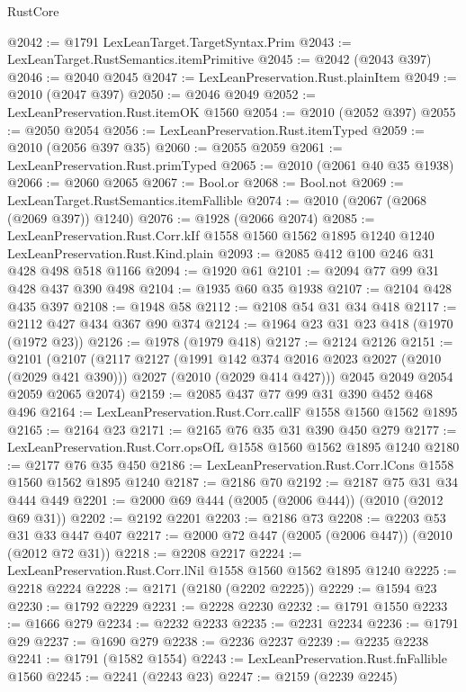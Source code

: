 \begin{lexlean}{RustCore}
\begin{coremodule}
@2042 := @1791 LexLeanTarget.TargetSyntax.Prim
@2043 := LexLeanTarget.RustSemantics.itemPrimitive
@2045 := @2042 (@2043 @397)
@2046 := @2040 @2045
@2047 := LexLeanPreservation.Rust.plainItem
@2049 := @2010 (@2047 @397)
@2050 := @2046 @2049
@2052 := LexLeanPreservation.Rust.itemOK @1560
@2054 := @2010 (@2052 @397)
@2055 := @2050 @2054
@2056 := LexLeanPreservation.Rust.itemTyped
@2059 := @2010 (@2056 @397 @35)
@2060 := @2055 @2059
@2061 := LexLeanPreservation.Rust.primTyped
@2065 := @2010 (@2061 @40 @35 @1938)
@2066 := @2060 @2065
@2067 := Bool.or
@2068 := Bool.not
@2069 := LexLeanTarget.RustSemantics.itemFallible
@2074 := @2010 (@2067 (@2068 (@2069 @397)) @1240)
@2076 := @1928 (@2066 @2074)
@2085 := LexLeanPreservation.Rust.Corr.kIf
    @1558
    @1560
    @1562
    @1895
    @1240
    @1240
    LexLeanPreservation.Rust.Kind.plain
@2093 := @2085 @412 @100 @246 @31 @428 @498 @518 @1166
@2094 := @1920 @61
@2101 := @2094 @77 @99 @31 @428 @437 @390 @498
@2104 := @1935 @60 @35 @1938
@2107 := @2104 @428 @435 @397
@2108 := @1948 @58
@2112 := @2108 @54 @31 @34 @418
@2117 := @2112 @427 @434 @367 @90 @374
@2124 := @1964 @23 @31 @23 @418 (@1970 (@1972 @23))
@2126 := @1978 (@1979 @418)
@2127 := @2124 @2126
@2151 := @2101
    (@2107
      (@2117
        @2127
        (@1991 @142 @374 @2016 @2023 @2027 (@2010 (@2029 @421 @390)))
        @2027
        (@2010 (@2029 @414 @427)))
      @2045
      @2049
      @2054
      @2059
      @2065
      @2074)
@2159 := @2085 @437 @77 @99 @31 @390 @452 @468 @496
@2164 := LexLeanPreservation.Rust.Corr.callF @1558 @1560 @1562 @1895
@2165 := @2164 @23
@2171 := @2165 @76 @35 @31 @390 @450 @279
@2177 := LexLeanPreservation.Rust.Corr.opsOfL @1558 @1560 @1562 @1895 @1240
@2180 := @2177 @76 @35 @450
@2186 := LexLeanPreservation.Rust.Corr.lCons @1558 @1560 @1562 @1895 @1240
@2187 := @2186 @70
@2192 := @2187 @75 @31 @34 @444 @449
@2201 := @2000 @69 @444 (@2005 (@2006 @444)) (@2010 (@2012 @69 @31))
@2202 := @2192 @2201
@2203 := @2186 @73
@2208 := @2203 @53 @31 @33 @447 @407
@2217 := @2000 @72 @447 (@2005 (@2006 @447)) (@2010 (@2012 @72 @31))
@2218 := @2208 @2217
@2224 := LexLeanPreservation.Rust.Corr.lNil @1558 @1560 @1562 @1895 @1240
@2225 := @2218 @2224
@2228 := @2171 (@2180 (@2202 @2225))
@2229 := @1594 @23
@2230 := @1792 @2229
@2231 := @2228 @2230
@2232 := @1791 @1550
@2233 := @1666 @279
@2234 := @2232 @2233
@2235 := @2231 @2234
@2236 := @1791 @29
@2237 := @1690 @279
@2238 := @2236 @2237
@2239 := @2235 @2238
@2241 := @1791 (@1582 @1554)
@2243 := LexLeanPreservation.Rust.fnFallible @1560
@2245 := @2241 (@2243 @23)
@2247 := @2159 (@2239 @2245)

\end{coremodule}
\end{lexlean}
